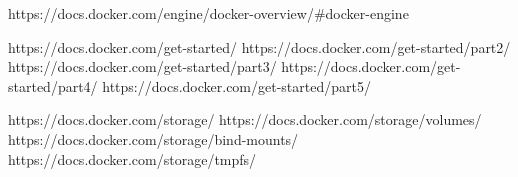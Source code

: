 \documentclass[]{article}
\begin{document}
\begin{thebibliography}{99}
	\it

	https://docs.docker.com/engine/docker-overview/\#docker-engine
	
	https://docs.docker.com/get-started/
	https://docs.docker.com/get-started/part2/
	https://docs.docker.com/get-started/part3/
	https://docs.docker.com/get-started/part4/
	https://docs.docker.com/get-started/part5/
	
	
	https://docs.docker.com/storage/
	https://docs.docker.com/storage/volumes/
	https://docs.docker.com/storage/bind-mounts/
	https://docs.docker.com/storage/tmpfs/
	

\end{thebibliography}
\end{document}
